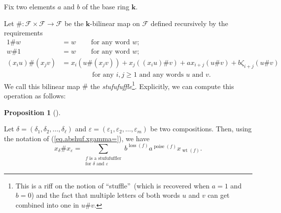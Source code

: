 \documentclass[numbers=enddot,12pt,final,onecolumn,notitlepage]{scrartcl}%
\theoremstyle{definition}
\newtheorem{prop}[theo]{Proposition}
\newenvironment{proposition}[1][]
{\begin{prop}[#1]\begin{leftbar}}
{\end{leftbar}\end{prop}}
\let\sumnonlimits\sum
\renewcommand{\sum}{\sumnonlimits\limits}
\begin{document}
Fix two elements $a$ and $b$ of the base ring $\mathbf{k}$.

Let $\#:\mathcal{F}\times\mathcal{F}\rightarrow\mathcal{F}$ be the
$\mathbf{k}$-bilinear map on $\mathcal{F}$ defined recursively by the
requirements%
\begin{align*}
1\#w  &  =w\ \ \ \ \ \ \ \ \ \ \text{for any word }w;\\
w\#1  &  =w\ \ \ \ \ \ \ \ \ \ \text{for any word }w;\\
\left(  x_{i}u\right)  \#\left(  x_{j}v\right)   &  =x_{i}\left(  u\#\left(
x_{j}v\right)  \right)  +x_{j}\left(  \left(  x_{i}u\right)  \#v\right)
+ax_{i+j}\left(  u\#v\right)  +b\zeta_{i+j}\left(  u\#v\right) \\
&  \ \ \ \ \ \ \ \ \ \ \ \ \ \ \ \ \ \ \ \ \text{for any }i,j\geq1\text{ and
any words }u\text{ and }v\text{.}%
\end{align*}
We call this bilinear map $\#$ the \emph{stufufuffle}\footnote{This is a riff
on the notion of \textquotedblleft stuffle\textquotedblright\ (which is
recovered when $a=1$ and $b=0$) and the fact that multiple letters of both
words $u$ and $v$ can get combined into one in $u\#v$.}. Explicitly, we can
compute this operation as follows:

\begin{proposition}
\label{prop.stufufuf.explicit}Let $\delta=\left(  \delta_{1},\delta_{2}%
,\ldots,\delta_{\ell}\right)  $ and $\varepsilon=\left(  \varepsilon
_{1},\varepsilon_{2},\ldots,\varepsilon_{m}\right)  $ be two compositions.
Then, using the notation of (\ref{eq.abshuf.xgamma=}), we have%
\[
x_{\delta}\#x_{\varepsilon}=\sum_{\substack{f\text{ is a stufufuffler}%
\\\text{for }\delta\text{ and }\varepsilon}}b^{\operatorname*{loss}\left(
f\right)  }a^{\operatorname*{poise}\left(  f\right)  }x_{\operatorname*{wt}%
\left(  f\right)  }.
\]

\end{proposition}
\end{document}
